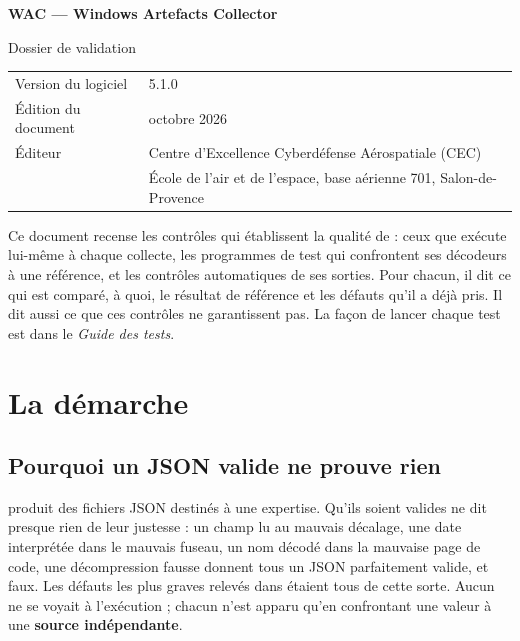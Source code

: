 \documentclass[11pt,a4paper,oneside]{report}
\begin{document}

\thispagestyle{empty}
\vspace*{\fill}
{\color{marine}\Large\bfseries WAC — Windows Artefacts Collector}\par
{\color{bleu}Dossier de validation}\par
\medskip
\begin{tabular}{@{}ll@{}}
Version du logiciel & 5.1.0 \\
Édition du document & octobre 2026 \\
Éditeur & Centre d'Excellence Cyberdéfense Aérospatiale (CEC) \\
        & École de l'air et de l'espace, base aérienne 701, Salon-de-Provence \\
\end{tabular}

\bigskip
{\small\color{gris}Ce document recense les contrôles qui établissent la
qualité de \wac{} : ceux que \wac{} exécute lui-même à chaque collecte, les
programmes de test qui confrontent ses décodeurs à une référence, et les
contrôles automatiques de ses sorties. Pour chacun, il dit ce qui est comparé,
à quoi, le résultat de référence et les défauts qu'il a déjà pris. Il dit aussi
ce que ces contrôles ne garantissent pas. La façon de lancer chaque test est
dans le \emph{Guide des tests}.}
\vspace*{2cm}
\clearpage

\tableofcontents

\chapter{La démarche}

\section{Pourquoi un JSON valide ne prouve rien}

\wac{} produit des fichiers JSON destinés à une expertise. Qu'ils soient
valides ne dit presque rien de leur justesse : un champ lu au mauvais décalage,
une date interprétée dans le mauvais fuseau, un nom décodé dans la mauvaise
page de code, une décompression fausse donnent tous un JSON parfaitement
valide, et faux. Les défauts les plus graves relevés dans \wac{} étaient tous de
cette sorte. Aucun ne se voyait à l'exécution ; chacun n'est apparu qu'en
confrontant une valeur à une \textbf{source indépendante}.
\end{document}
